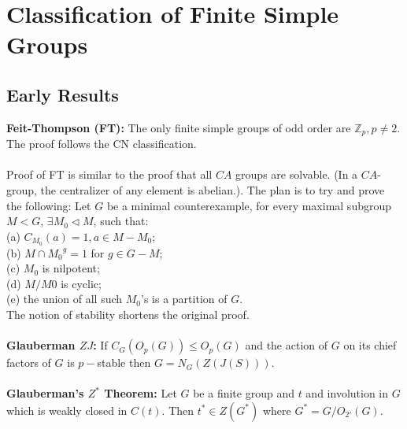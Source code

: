 \chapter{Classification of Finite Simple Groups}
\section{Early Results}
{\bf Feit-Thompson (FT):}  The only finite simple groups of odd order are
${\mathbb Z}_p, p\ne 2$. The proof follows the CN classification.\\
\\
Proof of FT is similar to the proof that all $CA$ groups are solvable. (In a $CA$-group,
the centralizer of any element is abelian.).  The plan is to try and prove the following:
Let $G$ be a minimal counterexample, for every maximal subgroup $M<G$, $\exists M_0 \lhd M$,
such that:\\
(a) $C_{M_0}(a) =1, a \in M - M_0$;\\
(b) $M \cap {M_0}^g = 1$ for $g \in G-M$;\\
(c) $M_0$ is nilpotent;\\
(d) $M/M0$ is cyclic; \\
(e) the union of all such $M_0$'s is a partition of $G$.\\
The notion of stability shortens the original proof.
\\
\\
{\bf Glauberman $ZJ$:}  If $C_G(O_p(G)) \le O_p(G)$ and the action of
$G$ on its chief factors of $G$ is $p-$stable then $G=N_G(Z(J(S)))$. \\
\\
{\bf Glauberman's $Z^*$ Theorem:}
Let $G$ be a finite group and $t$ and involution in $G$ which is weakly closed in
$C(t)$.  Then $t^* \in Z(G^*)$  where $G^*= G/O_{2'} (G)$.
